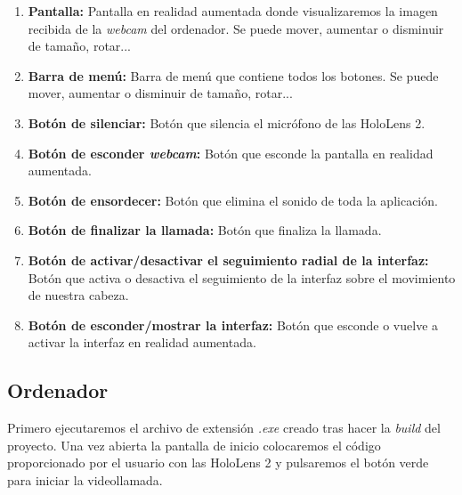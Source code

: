 \begin{enumerate}
    \item \textbf{Pantalla:} Pantalla en realidad aumentada donde visualizaremos la imagen recibida de la \textit{webcam} del ordenador. Se puede mover, aumentar o disminuir de tamaño, rotar...
    \item \textbf{Barra de menú:} Barra de menú que contiene todos los botones. Se puede mover, aumentar o disminuir de tamaño, rotar...
    \item \textbf{Botón de silenciar:} Botón que silencia el micrófono de las HoloLens 2.
    \item \textbf{Botón de esconder \textit{webcam}:} Botón que esconde la pantalla en realidad aumentada.
    \item \textbf{Botón de ensordecer:} Botón que elimina el sonido de toda la aplicación.
    \item \textbf{Botón de finalizar la llamada:} Botón que finaliza la llamada.
    \item \textbf{Botón de activar/desactivar el seguimiento radial de la interfaz:} Botón que activa o desactiva el seguimiento de la interfaz sobre el movimiento de nuestra cabeza.
    \item \textbf{Botón de esconder/mostrar la interfaz:} Botón que esconde o vuelve a activar la interfaz en realidad aumentada.
\end{enumerate}

\newpage
\subsection{Ordenador}
Primero ejecutaremos el archivo de extensión \textit{.exe} creado tras hacer la \textit{build} del proyecto. Una vez abierta la pantalla de inicio colocaremos el código proporcionado por el usuario con las HoloLens 2 y pulsaremos el botón verde para iniciar la videollamada.


